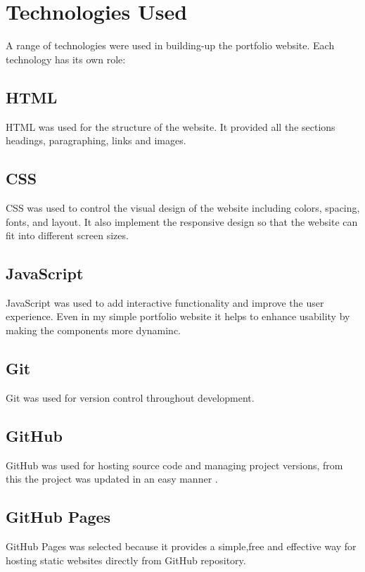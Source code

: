 \documentclass[12pt,a4paper]{article}
\begin{document}
\section{Technologies Used}
A range of technologies were used in building-up the portfolio website. Each technology has its own role:
\subsection{HTML}

HTML was used for the structure of the website. It provided all the sections headings, paragraphing, links and images. 

\subsection{CSS}

CSS was used to control the visual design of the website including colors, spacing, fonts, and layout. It also implement the responsive design so that the website can fit into different screen sizes.

\subsection{JavaScript}

JavaScript was used to add interactive functionality and improve the user experience. Even in my simple portfolio website it helps to enhance usability by making the components more dynaminc.

\subsection{Git}

Git was used for version control throughout development.

\subsection{GitHub}

GitHub was used for hosting source code and managing project versions, from this the project was updated in an easy manner .

\subsection{GitHub Pages}

GitHub Pages was selected because it provides a simple,free and effective way for hosting static websites directly from GitHub repository.
\end{document}
